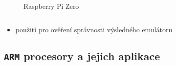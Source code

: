 \documentclass[compress]{beamer}
\begin{document}
\begin{frame}
\begin{columns}
\begin{figure}
			\caption{Raspberry Pi Zero}
			\label{Raspberry Pi Zero}
		\end{figure}
	\end{columns}
	\vspace{0.2cm}
	\noindent\makebox[\linewidth]{\rule{\textwidth}{0.4pt}}
	\vspace{-0.4cm}
	\begin{itemize}
		\item použití \href{https://github.com/MartinUbl/KIV-RTOS}{} pro ověření správnosti výsledného emulátoru
	\end{itemize}
\end{frame}

\subsection{\texttt{ARM} procesory a jejich aplikace}
\end{document}
